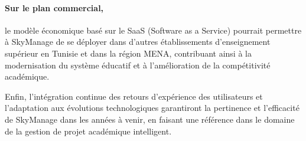 \paragraph{Sur le plan commercial,} le modèle économique basé sur le SaaS (Software as a Service) pourrait permettre à SkyManage de se déployer dans d'autres établissements d'enseignement supérieur en Tunisie et dans la région MENA, contribuant ainsi à la modernisation du système éducatif et à l'amélioration de la compétitivité académique.

Enfin, l'intégration continue des retours d'expérience des utilisateurs et l'adaptation aux évolutions technologiques garantiront la pertinence et l'efficacité de SkyManage dans les années à venir, en faisant une référence dans le domaine de la gestion de projet académique intelligent.
